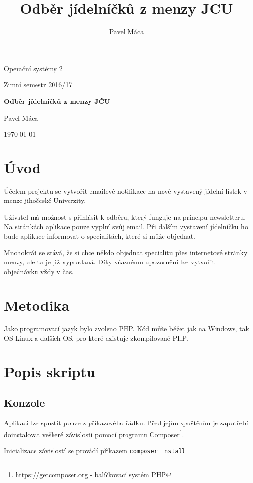 \documentclass[a4]{article}
\title{Odběr jídelníčků z menzy JCU}
\author{Pavel Máca}
\begin{document}
\begin{titlepage}
	\centering
	{\Huge Operační systémy 2\par}
	\vspace{1cm}
	{\Large Zimní semestr 2016/17\par}
	\vspace{1.5cm}
	{\huge\bfseries Odběr jídelníčků z menzy JČU\par}
	\vspace{2cm}
	{\Large Pavel Máca\par}
	\vfill


	{\large \today\par}
\end{titlepage}

\pagebreak

\section{Úvod}
Účelem projektu se vytvořit emailové notifikace na nově vystavený jídelní lístek v menze jihočeské Univerzity.

Uživatel má možnost s přihlásit k odběru, který funguje na principu newsletteru. Na stránkách aplikace pouze vyplní svůj email. Při dalším vystavení jídelníčku ho bude aplikace informovat o specialitách, které si může objednat.

Mnohokrát se stává, že si chce někdo objednat specialitu přes internetové stránky menzy, ale ta je již vyprodaná. Díky včasnému upozornění lze vytvořit objednávku vždy v čas.


\section{Metodika}
Jako programovací jazyk bylo zvoleno PHP. Kód může běžet jak na Windows, tak OS Linux  a dalších OS, pro které existuje zkompilované PHP.

\section{Popis skriptu}
\subsection{Konzole}
Aplikaci lze spustit pouze z příkazového řádku. Před jejím spuštěním je zapotřebí doinstalovat veškeré závislosti pomocí programu Composer\footnote{https://getcomposer.org - balíčkovací systém PHP}.


Inicializace závislostí se provádí příkazem
\lstinline{composer install}
\end{document}
